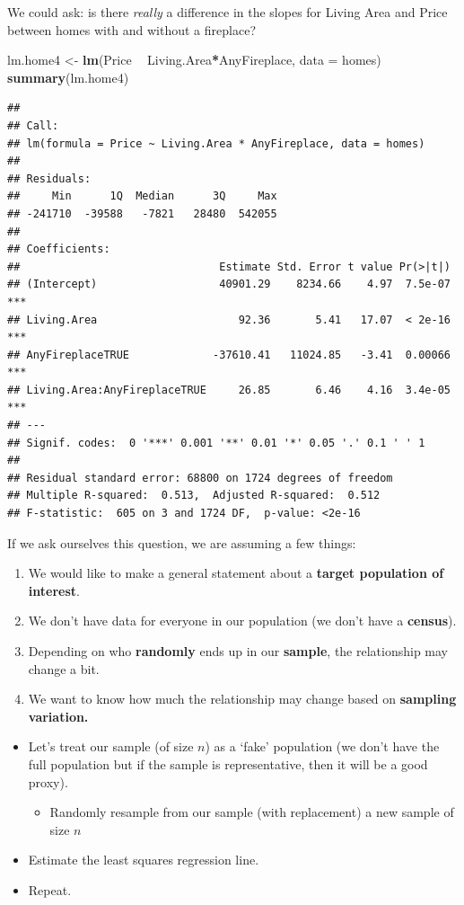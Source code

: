 \documentclass[]{book}
\newenvironment{Shaded}{\begin{snugshade}}{\end{snugshade}}
\newcommand{\DataTypeTok}[1]{\textcolor[rgb]{0.13,0.29,0.53}{#1}}
\newcommand{\KeywordTok}[1]{\textcolor[rgb]{0.13,0.29,0.53}{\textbf{#1}}}
\newcommand{\NormalTok}[1]{#1}
\newcommand{\OperatorTok}[1]{\textcolor[rgb]{0.81,0.36,0.00}{\textbf{#1}}}
\newcommand{\StringTok}[1]{\textcolor[rgb]{0.31,0.60,0.02}{#1}}
\providecommand{\tightlist}{%
  \setlength{\itemsep}{0pt}\setlength{\parskip}{0pt}}
\begin{document}
We could ask: is there \emph{really} a difference in the slopes for Living Area and Price between homes with and without a fireplace?

\begin{Shaded}
\begin{Highlighting}[]
\NormalTok{lm.home4 <-}\StringTok{ }\KeywordTok{lm}\NormalTok{(Price }\OperatorTok{~}\StringTok{ }\NormalTok{Living.Area}\OperatorTok{*}\NormalTok{AnyFireplace, }\DataTypeTok{data =}\NormalTok{ homes) }
\KeywordTok{summary}\NormalTok{(lm.home4)}
\end{Highlighting}
\end{Shaded}

\begin{verbatim}
## 
## Call:
## lm(formula = Price ~ Living.Area * AnyFireplace, data = homes)
## 
## Residuals:
##     Min      1Q  Median      3Q     Max 
## -241710  -39588   -7821   28480  542055 
## 
## Coefficients:
##                               Estimate Std. Error t value Pr(>|t|)    
## (Intercept)                   40901.29    8234.66    4.97  7.5e-07 ***
## Living.Area                      92.36       5.41   17.07  < 2e-16 ***
## AnyFireplaceTRUE             -37610.41   11024.85   -3.41  0.00066 ***
## Living.Area:AnyFireplaceTRUE     26.85       6.46    4.16  3.4e-05 ***
## ---
## Signif. codes:  0 '***' 0.001 '**' 0.01 '*' 0.05 '.' 0.1 ' ' 1
## 
## Residual standard error: 68800 on 1724 degrees of freedom
## Multiple R-squared:  0.513,  Adjusted R-squared:  0.512 
## F-statistic:  605 on 3 and 1724 DF,  p-value: <2e-16
\end{verbatim}

If we ask ourselves this question, we are assuming a few things:

\begin{enumerate}
\def\labelenumi{\arabic{enumi}.}
\item
  We would like to make a general statement about a \textbf{target population of interest}.
\item
  We don't have data for everyone in our population (we don't have a \textbf{census}).
\item
  Depending on who \textbf{randomly} ends up in our \textbf{sample}, the relationship may change a bit.
\item
  We want to know how much the relationship may change based on \textbf{sampling variation.}
\end{enumerate}

\begin{itemize}
\tightlist
\item
  Let's treat our sample (of size \(n\)) as a `fake' population (we don't have the full population but if the sample is representative, then it will be a good proxy).

  \begin{itemize}
  \tightlist
  \item
    Randomly resample from our sample (with replacement) a new sample of size \(n\)
  \end{itemize}
\item
  Estimate the least squares regression line.
\item
  Repeat.
\end{itemize}
\end{document}
